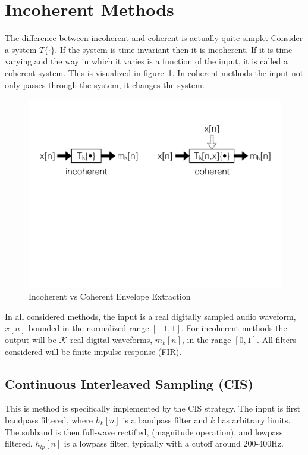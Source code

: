 \documentclass [11pt, proquest,oneside] {ganter_thesis}[2015/03/03]
\begin{document}
\section{Incoherent Methods}

The difference between incoherent and coherent is actually quite simple.  Consider a system $T\{\cdot\}$.  If the system is time-invariant then it is incoherent.  If it is time-varying and the way in which it varies is a function of the input, it is called a coherent system.  This is visualized in figure~\ref{fig:incoherent_vs_coherent}.  In coherent methods the input not only passes through the system, it changes the system.

\begin{figure}[!ht]
  \centering
    \includegraphics[width=1\textwidth]{incoherent_vs_coherent}   
    \caption{Incoherent vs Coherent Envelope Extraction}\label{fig:incoherent_vs_coherent}
\end{figure}

In all considered methods, the input is a real digitally sampled audio waveform, $x[n]$ bounded in the normalized range $[-1, 1]$.  For incoherent methods the output will be $\mathcal{K}$ real digital waveforms, $m_k[n]$, in the range $[0, 1]$.  All filters considered will be finite impulse response (FIR).

\subsection{Continuous Interleaved Sampling (CIS)}

This is method is specifically implemented by the CIS strategy.  The input is first bandpass filtered, where $h_k[n]$ is a bandpass filter and $k$ has arbitrary limits.  The subband is then full-wave rectified, (magnitude operation), and lowpass filtered.  $h_{lp}[n]$ is a lowpass filter, typically with a cutoff around 200-400Hz.
\end{document}
